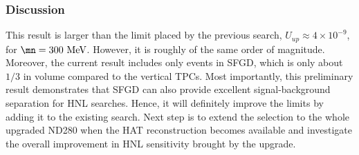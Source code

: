         \subsubsection{Discussion}
        This result is larger than the limit placed by the previous search, $U_{up}\approx4\times10^{-9}$, for $\mn=300~\mev$. 
        However, it is roughly of the same order of magnitude. 
        Moreover, the current result includes only events in SFGD, which is only about $1/3$ in volume compared to the vertical TPCs. 
        Most importantly, this preliminary result demonstrates that SFGD can also provide excellent signal-background separation for HNL searches.
        Hence, it will definitely improve the limits by adding it to the existing search. 
        Next step is to extend the selection to the whole upgraded ND280 when the HAT reconstruction becomes available and investigate the overall improvement in HNL sensitivity brought by the upgrade. 
 